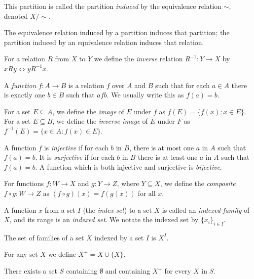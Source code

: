 \begin{defn}
  This partition is called the partition \emph{induced} by the equivalence
  relation $\sim$, denoted $X/\sim$.
\end{defn}
\begin{prop}
  The equivalence relation induced by a partition induces that partition; the
  partition induced by an equivalence relation induces that relation.
\end{prop}
\begin{defn}
  For a relation $R$ from $X$ to $Y$ we define the \emph{inverse} relation
  $R^{-1}:Y\to X$ by $xRy\iff yR^{-1}x$.
\end{defn}
\begin{defn}
  A \emph{function} $f:A\to B$ is a relation $f$ over $A$ and $B$ such that
  for each $a\in A$ there is exactly one $b\in B$ such that $afb$. We usually
  write this as $f(a)=b$.
\end{defn}
\begin{defn}
  For a set $E\subseteq A$, we define the \emph{image} of $E$ under $f$ as
  $f(E)=\{f(x):x\in E\}$. For a set $E\subseteq B$, we define the \emph{inverse
    image} of $E$ under $F$ as $f^{-1}(E)=\{x\in A:f(x)\in E\}$.
\end{defn}
\begin{defn}
  A function $f$ is \emph{injective} if for each $b$ in $B$, there is at most one
  $a$ in $A$ such that $f(a)=b$. It is \emph{surjective} if for each $b$ in
  $B$ there is at least one $a$ in $A$ such that $f(a)=b$. A function which is
  both injective and surjective is \emph{bijective}.
\end{defn}
\begin{defn}
  For functions $f:W\to X$ and $g:Y\to Z$, where $Y\subseteq X$, we define the
  \emph{composite} $f\circ g:W\to Z$ as $(f\circ g)(x)=f(g(x))$ for all $x$.
\end{defn}
\begin{defn}
  A function $x$ from a set $I$ (the \emph{index set}) to a set $X$ is called an
  \emph{indexed family} of $X$, and its range is an \emph{indexed set}. We
  notate the indexed set by $\{x_i\}_{i\in I}$.
\end{defn}
\begin{defn}
  The set of families of a set $X$ indexed by a set $I$ is $X^I$.
\end{defn}
\begin{defn}
  For any set $X$ we define $X^+=X\cup\{X\}$.
\end{defn}
\begin{axiom}[Infinity]
  There exists a set $S$ containing $\emptyset$ and containing $X^+$ for
  every $X$ in $S$.
\end{axiom}
